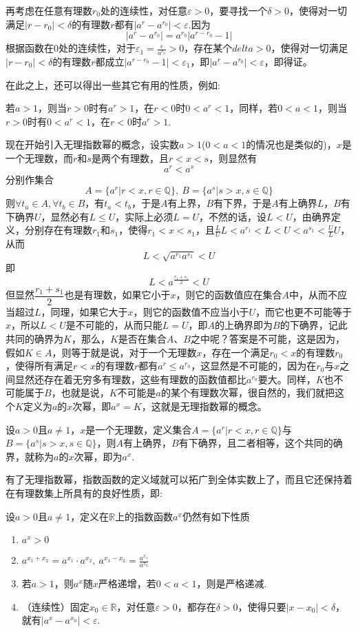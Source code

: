 再考虑在任意有理数$r_0$处的连续性，对任意$\varepsilon>0$，要寻找一个$\delta>0$，使得对一切满足$|r-r_0|<\delta$的有理数$r$都有$|a^r-a^{r_0}|<\varepsilon$.因为
\[ |a^r-a^{r_0}| = a^{r_0} |a^{r-r_0}-1| \]
根据函数在0处的连续性，对于$\varepsilon_1 = \frac{\varepsilon}{a^{r_0}}>0$，存在某个$delta>0$，使得对一切满足$|r-r_0|<\delta$的有理数$r$都成立$|a^{r-r_0}-1|<\varepsilon_1$，即$|a^r-a^{r_0}|<\varepsilon$，即得证。

在此之上，还可以得出一些其它有用的性质，例如:
\begin{inference}
  若$a>1$，则当$r>0$时有$a^r>1$，在$r<0$时$0<a^r<1$，同样，若$0<a<1$，则当$r>0$时有$0<a^r<1$，在$r<0$时$a^r>1$.
\end{inference}

现在开始引入无理指数幂的概念，设实数$a>1$($0<a<1$的情况也是类似的)，$x$是一个无理数，而$r$和$s$是两个有理数，且$r<x<s$，则显然有
\[ a^r<a^s \]
分别作集合
\[ A = \{ a^r | r<x,r \in \mathbb{Q} \}, \  B = \{ a^s | s>x,s \in \mathbb{Q} \} \]
则$\forall t_a \in A, \forall t_b \in B$，有$t_a<t_b$，于是$A$有上界，$B$有下界，于是$A$有上确界$L$，$B$有下确界$U$，显然必有$L\leqslant U$，实际上必须$L=U$，不然的话，设$L<U$，由确界定义，分别存在有理数$r_1$和$s_1$，使得$r_1<x<s_1$，且$\frac{L}{U}L<a^{r_1}<L<U<a^{s_1}<\frac{U}{L}U$，从而
\[ L<\sqrt{a^{r_1}a^{s_1}}<U \]
即
\[ L<a^{\frac{r_1+s_1}{2}}<U \]
但显然$\dfrac{r_1+s_1}{2}$也是有理数，如果它小于$x$，则它的函数值应在集合$A$中，从而不应当超过$L$，同理，如果它大于$x$，则它的函数值不应当小于$U$，而它也更不可能等于$x$，所以$L<U$是不可能的，从而只能$L=U$，即$A$的上确界即为$B$的下确界，记此共同的确界为$K$，那么，$K$是否在集合$A$、$B$之中呢？答案是不可能，这是因为，假如$K \in A$，则等于就是说，对于一个无理数$x$，存在一个满足$r_0<x$的有理数$r_0$，使得所有满足$r<x$的有理数$r$都有$a^r \leqslant a^{r_0}$，这显然是不可能的，因为在$r_0$与$x$之间显然还存在着无穷多有理数，这些有理数的函数值都比$a^{r_0}$要大。同样，$K$也不可能属于$B$，也就是说，$K$不可能是$a$的某个有理数次幂，很自然的，我们就把这个$K$定义为$a$的$x$次幂，即$a^x=K$，这就是无理指数幂的概念。

\begin{definition}
  设$a>0$且$a \neq 1$，$x$是一个无理数，定义集合$A=\{a^r|r<x,r \in \mathbb{Q} \}$与$B=\{a^s|s>x,s \in \mathbb{Q}\}$，则$A$有上确界，$B$有下确界，且二者相等，这个共同的确界，就称为$a$的$x$次幂，即为$a^x$.
\end{definition}

有了无理指数幂，指数函数的定义域就可以拓广到全体实数上了，而且它还保持着在有理数集上所具有的良好性质，即:
\begin{theorem}
  设$a>0$且$a \neq 1$，定义在$\mathbb{R}$上的指数函数$a^x$仍然有如下性质
\begin{enumerate}
\item $a^x>0$
\item $a^{x_1+x_2}=a^{x_1}\cdot a^{x_2}, \ a^{x_1-x_2} = \frac{a^{x_1}}{a^{x_2}} $
\item 若$a>1$，则$a^x$随$x$严格递增，若$0<a<1$，则是严格递减.
\item （连续性）固定$x_0\in \mathbb{R}$，对任意$\varepsilon>0$，都存在$\delta>0$，使得只要$|x-x_0|<\delta$，就有$|a^x-a^{x_0}|<\varepsilon$.
\end{enumerate}
\end{theorem}

